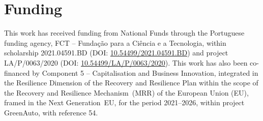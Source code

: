 \section*{Funding}
This work has received funding from National Funds through the Portuguese
funding agency, FCT -- Fundação para a Ciência e a Tecnologia, within
scholarship 2021.04591.BD
(DOI: \href{https://doi.org/10.54499/2021.04591.BD}{10.54499/2021.04591.BD})
and project LA/P/0063/2020
(DOI: \href{https://doi.org/10.54499/LA/P/0063/2020}{10.54499/LA/P/0063/2020}).
This work has also been co-financed by Component 5 -- Capitalisation
and Business Innovation, integrated in the Resilience Dimension of the Recovery
and Resilience Plan within the scope of the Recovery and Resilience
Mechanism~(MRR) of the European Union (EU), framed in the Next Generation~EU,
for the period 2021--2026, within project GreenAuto, with reference 54.
